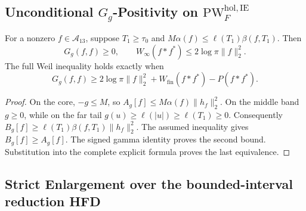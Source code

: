\subsection{Unconditional \(G_g\)-Positivity on \(\mathrm{PW}^{\mathrm{hol},\mathrm{IE}}_{F}\)}
\label{v4-arith:w7-e:IE-closure}

\begin{theorem}
\label{v4-arith:w7-e:thm:IE-ATP}
For a nonzero $f\in\mathscr A_{13}$, suppose $T_1\ge \tau_0$ and
$M\alpha(f)\le \ell(T_1)\beta(f,T_1)$.
Then
\begin{equation}
\label{v4-arith:w7-e:eq:IE-closure}
 G_g(f,f)\ge0,\qquad
 W_\infty(f*f^*)\le2\log\pi\|f\|_2^2.
\end{equation}
The full Weil inequality holds exactly when
\[
 G_g(f,f)\ge2\log\pi\|f\|_2^2
             +W_{\mathrm{fin}}(f*f^*)-P(f*f^*).
\]
\end{theorem}
\begin{proof}
On the core, $-g\le M$, so
$A_g[f]\le M\alpha(f)\|h_f\|_2^2$.
On the middle band $g\ge0$, while on the far tail
$g(u)\ge \ell(|u|)\ge \ell(T_1)\ge0$.
Consequently $B_g[f]\ge \ell(T_1)\beta(f,T_1)\|h_f\|_2^2$.
The assumed inequality gives $B_g[f]\ge A_g[f]$.
The signed gamma identity proves the second bound.
Substitution into the complete explicit formula proves the last equivalence.
\end{proof}

\subsection{Strict Enlargement over the bounded-interval reduction HFD}
\label{v4-arith:w7-e:strict-enlargement}

